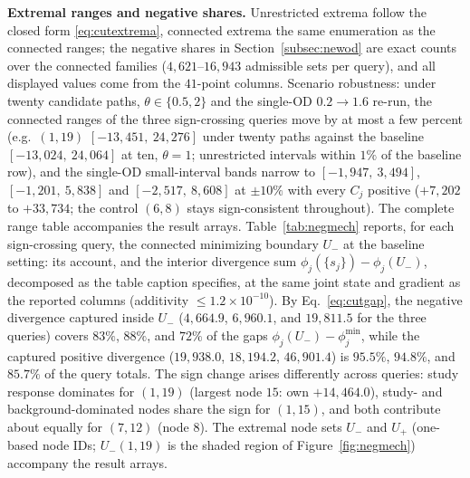 \textbf{Extremal ranges and negative shares.}
Unrestricted extrema follow the closed form \eqref{eq:cutextrema},
connected extrema the same enumeration as the connected ranges; the
negative shares in Section~\ref{subsec:newod} are exact counts over
the connected families ($4{,}621$--$16{,}943$ admissible sets per
query), and all displayed values come from the $41$-point columns.
Scenario robustness: under twenty candidate paths, $\theta\in\{0.5,2\}$
and the single-OD $0.2\to1.6$ re-run, the connected ranges of the
three sign-crossing queries move by at most a few percent (e.g.\
$(1,19)$ $[-13{,}451,\ 24{,}276]$ under twenty paths against the
baseline $[-13{,}024,\ 24{,}064]$ at ten, $\theta=1$; unrestricted
intervals within $1\%$ of the baseline row), and the single-OD
small-interval bands narrow to $[-1{,}947,\ 3{,}494]$, $[-1{,}201,\
5{,}838]$ and $[-2{,}517,\ 8{,}608]$ at $\pm10\%$ with every $C_j$
positive ($+7{,}202$ to $+33{,}734$; the control $(6,8)$ stays
sign-consistent throughout). The complete range table accompanies the
result arrays.
Table~\ref{tab:negmech} reports, for each sign-crossing query, the
connected minimizing boundary $U_-$ at the baseline setting: its
account, and the interior divergence sum
$\phi_j(\{s_j\})-\phi_j(U_-)$, decomposed as the table caption
specifies, at the same joint state and gradient as the reported
columns (additivity $\le1.2\times10^{-10}$).
By Eq.~\eqref{eq:cutgap}, the negative divergence captured inside
$U_-$ ($4{,}664.9$, $6{,}960.1$, and $19{,}811.5$ for the three
queries) covers $83\%$, $88\%$, and $72\%$ of the gaps
$\phi_j(U_-)-\phi_j^{\min}$, while the captured positive divergence
($19{,}938.0$, $18{,}194.2$, $46{,}901.4$) is $95.5\%$, $94.8\%$,
and $85.7\%$ of the query totals. The sign change arises
differently across queries: study response
dominates for $(1,19)$ (largest node $15$: own $+14{,}464.0$),
study- and background-dominated nodes share the sign for $(1,15)$,
and both contribute about equally for $(7,12)$ (node $8$). The
extremal node sets $U_-$ and $U_+$ (one-based node IDs; $U_-(1,19)$
is the shaded region of Figure~\ref{fig:negmech}) accompany the
result arrays.

